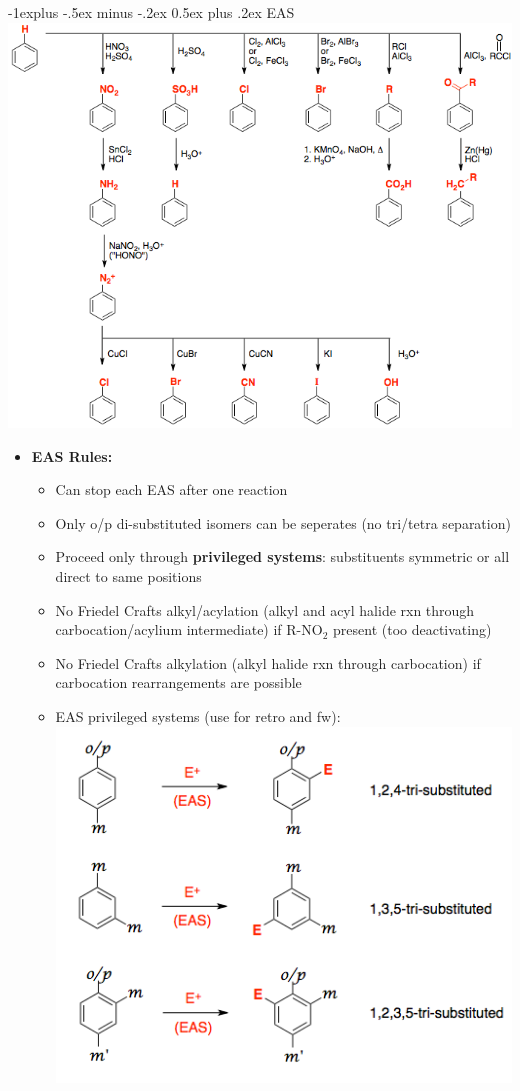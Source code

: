 \documentclass[10pt,landscape]{article}
\makeatletter
\renewcommand{\subsection}{\@startsection{subsection}{2}{0mm}%
  {-1explus -.5ex minus -.2ex}%
  {0.5ex plus .2ex}%
  {\normalfont\normalsize\bfseries}}
\makeatother
\begin{document}
\begin{multicols*}{3}
\begin{scriptsize}
    \subsection{EAS}
    \includegraphics[scale=0.38]{eas.png}
    \begin{itemize}
    \item \textbf{EAS Rules:}
      \begin{itemize}
      \item Can stop each EAS after one reaction
      \item Only o/p di-substituted isomers can be seperates (no tri/tetra separation)
      \item Proceed only through \textbf{privileged systems}: substituents symmetric or all direct
        to same positions
      \item No Friedel Crafts alkyl/acylation (alkyl and acyl halide rxn through carbocation/acylium
        intermediate) if R-NO$_2$ present (too deactivating)
      \item No Friedel Crafts alkylation (alkyl halide rxn through carbocation) if
        carbocation rearrangements are possible
      \item EAS privileged systems (use for retro and fw):
        \includegraphics[scale=0.4]{privsys.png}

\end{itemize}
\end{itemize}
\end{scriptsize}
\end{multicols*}
\end{document}
